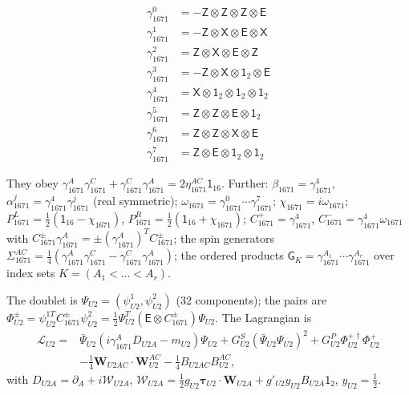 \documentclass[
  10pt,
]{article}
\begin{document}
\[
\begin{aligned}
\gamma^{0}_{1671}&=-\mathsf Z\otimes\mathsf Z\otimes\mathsf Z\otimes\mathsf E\\
\gamma^{1}_{1671}&=-\mathsf Z\otimes\mathsf X\otimes\mathsf E\otimes\mathsf X\\
\gamma^{2}_{1671}&=\mathsf Z\otimes\mathsf X\otimes\mathsf E\otimes\mathsf Z\\
\gamma^{3}_{1671}&=-\mathsf Z\otimes\mathsf X\otimes\mathsf 1_2\otimes\mathsf E\\
\gamma^{4}_{1671}&=\mathsf X\otimes\mathsf 1_2\otimes\mathsf 1_2\otimes\mathsf 1_2\\
\gamma^{5}_{1671}&=\mathsf Z\otimes\mathsf Z\otimes\mathsf E\otimes\mathsf 1_2\\
\gamma^{6}_{1671}&=\mathsf Z\otimes\mathsf Z\otimes\mathsf X\otimes\mathsf E\\
\gamma^{7}_{1671}&=\mathsf Z\otimes\mathsf E\otimes\mathsf 1_2\otimes\mathsf 1_2
\end{aligned}
\]

They obey
\(\gamma^A_{1671}\gamma^C_{1671}+\gamma^C_{1671}\gamma^A_{1671}=2\eta^{AC}_{1671}\mathsf 1_{16}\).
Further: \(\beta_{1671}=\gamma^4_{1671}\),
\(\alpha^j_{1671}=\gamma^4_{1671}\gamma^j_{1671}\) (real symmetric);
\(\omega_{1671}=\gamma^0_{1671}\cdots\gamma^7_{1671}\);
\(\chi_{1671}=i\omega_{1671}\);
\(P^L_{1671}=\tfrac12(\mathsf 1_{16}-\chi_{1671})\),
\(P^R_{1671}=\tfrac12(\mathsf 1_{16}+\chi_{1671})\);
\(C^+_{1671}=\gamma^4_{1671}\),
\(C^-_{1671}=\gamma^4_{1671}\omega_{1671}\) with
\(C^\pm_{1671}\gamma^A_{1671}=\pm(\gamma^A_{1671})^TC^\pm_{1671}\); the
spin generators
\(\Sigma^{AC}_{1671}=\tfrac14(\gamma^A_{1671}\gamma^C_{1671}-\gamma^C_{1671}\gamma^A_{1671})\);
the ordered products
\(\mathsf G_K=\gamma^{A_1}_{1671}\cdots\gamma^{A_r}_{1671}\) over index
sets \(K=(A_1<\dots<A_r)\).

The doublet is \(\Psi_{U2}=(\psi^1_{U2},\psi^2_{U2})\) (32 components);
the pairs are
\(\Phi^\pm_{U2}=\psi^{1T}_{U2}C^\pm_{1671}\psi^2_{U2}=\tfrac12\Psi^T_{U2}(\mathsf E\otimes C^\pm_{1671})\Psi_{U2}\).
The Lagrangian is
\[\begin{aligned}\mathcal L_{U2}={}&\bar\Psi_{U2}(i\gamma^A_{1671}D_{U2A}-m_{U2})\Psi_{U2}+G^S_{U2}(\bar\Psi_{U2}\Psi_{U2})^2+G^P_{U2}\Phi^{+\dagger}_{U2}\Phi^+_{U2}\\&-\tfrac14\boldsymbol W_{U2AC}\cdot\boldsymbol W^{AC}_{U2}-\tfrac14B_{U2AC}B^{AC}_{U2},\end{aligned}\]
with \(D_{U2A}=\partial_A+i\mathcal W_{U2A}\),
\(\mathcal W_{U2A}=\tfrac12g_{U2}\boldsymbol\tau_{U2}\cdot\boldsymbol W_{U2A}+g'_{U2}y_{U2}B_{U2A}\mathsf 1_2\),
\(y_{U2}=\tfrac12\).
\end{document}
